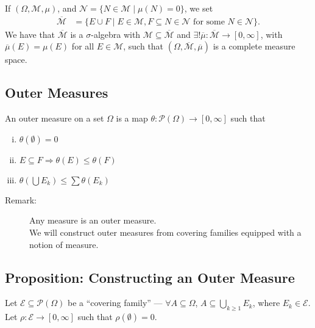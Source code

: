 \documentclass[10pt]{extarticle}
\begin{document}
  If $(\Omega,\mathcal{M},\mu)$, and $\mathcal{N} = \{N\in \mathcal{M}\mid \mu(N) = 0\}$, we set
  \begin{align*}
    \overline{\mathcal{M}} &= \{E\cup F\mid E\in \mathcal{M},F\subseteq N\in \mathcal{N}\text{ for some $N\in \mathcal{N}$}\}.
  \end{align*}
  We have that $ \overline{\mathcal{M}} $ is a $\sigma$-algebra with $\mathcal{M}\subseteq \overline{\mathcal{M}}$ and $\exists! \overline{\mu}: \overline{\mathcal{M}}\rightarrow [0,\infty]$, with $\overline{\mu}(E) = \mu(E)$ for all $E\in \mathcal{M}$, such that $(\Omega, \overline{\mathcal{M}},\overline{\mu})$ is a complete measure space.
  \subsection{Outer Measures}%
  An outer measure on a set $\Omega$ is a map $\theta: \mathcal{P}(\Omega)\rightarrow [0,\infty]$ such that
  \begin{enumerate}[(i)]
    \item $\theta(\emptyset) = 0$
    \item $E\subseteq F \Rightarrow \theta(E) \leq \theta(F)$
    \item $\theta\left(\bigcup E_k\right) \leq \sum \theta(E_k)$
  \end{enumerate}
  \begin{description}
    \item[Remark:] Any measure is an outer measure.\\

      We will construct outer measures from covering families equipped with a notion of measure.
  \end{description}
  \subsection{Proposition: Constructing an Outer Measure}%
  Let $\mathcal{E}\subseteq \mathcal{P}(\Omega)$ be a ``covering family'' --- $\forall A\subseteq \Omega$, $A\subseteq \bigcup_{k\geq 1}E_k$, where $E_k\in \mathcal{E}$. Let $\rho: \mathcal{E} \rightarrow [0,\infty]$ such that $\rho(\emptyset) = 0$.\\
\end{document}
